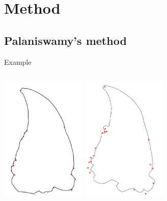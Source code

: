 \documentclass{beamer}
\begin{document}
\section{Method}
\subsection{Palaniswamy's method}     

\begin{frame}{Example}
	\begin{columns}[c]
		\includegraphics[height=6cm]{images/rshape}
		\includegraphics[height=6cm]{images/result}
	\end{columns}
\end{frame}
\end{document}

